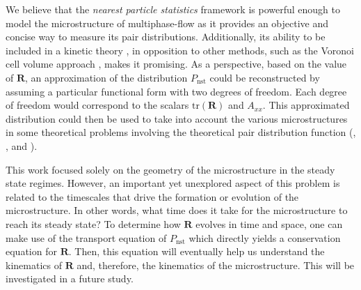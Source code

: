We believe that the \textit{nearest particle statistics} framework is powerful enough to model the microstructure of multiphase-flow as it provides an objective and concise way to measure its pair distributions. 
Additionally, its ability to be included in a kinetic theory \citep{zhang2023evolution}, in opposition to other methods,  such as the Voronoi cell volume approach \citep{senthil2005voronoi}, makes it promising. As a perspective, based on the value of $\textbf{R}$, an approximation of the distribution $P_\text{nst}$ could be reconstructed by assuming a particular functional form with two degrees of freedom.
Each degree of freedom would correspond to the scalars $\text{tr}(\textbf{R})$ and $A_{xx}$.
This approximated distribution could then be used to take into account the various microstructures in some theoretical problems involving the theoretical pair distribution function (\citet{batchelor1972sedimentation}, \citet{hinch1977averaged,wang1999longitudinal}, and \citet{zhang2021ensemble}).

This work focused solely on the geometry of the microstructure in the steady state regimes. 
However, an important yet unexplored aspect of this problem is related to the timescales that drive the formation or evolution of the microstructure. 
In other words, what time does it take for the microstructure to reach its steady state? 
To determine how $\textbf{R}$ evolves in time and space, one can make use of the transport equation of $P_\text{nst}$ which directly yields a conservation equation for $\textbf{R}$. 
Then, this equation will eventually help us understand the kinematics   of $\textbf{R}$ and, therefore, the kinematics   of the microstructure. 
This will be investigated in a future study. 

 



